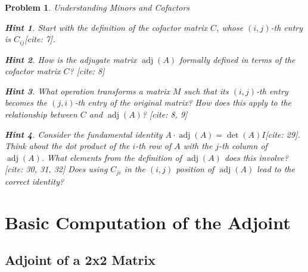 \documentclass[12pt]{article}
\newtheorem{problem}{Problem}[section]
\theoremstyle{definition}
\newtheorem{hint}{Hint}[question]
\newcommand{\adj}{\operatorname{adj}}
\newcommand{\detm}{\operatorname{det}}
\begin{document}
\begin{problem}{Understanding Minors and Cofactors}
        \begin{hint}
            Start with the definition of the cofactor matrix $C$, whose $(i, j)$-th entry is $C_{ij}$[cite: 7].
        \end{hint}
        \begin{hint}
            How is the adjugate matrix $\adj(A)$ formally defined in terms of the cofactor matrix $C$? [cite: 8]
        \end{hint}
        \begin{hint}
            What operation transforms a matrix $M$ such that its $(i, j)$-th entry becomes the $(j, i)$-th entry of the original matrix? How does this apply to the relationship between $C$ and $\adj(A)$? [cite: 8, 9]
        \end{hint}
        \begin{hint}
            Consider the fundamental identity $A \cdot \adj(A) = \detm(A) I$[cite: 29]. Think about the dot product of the $i$-th row of $A$ with the $j$-th column of $\adj(A)$. What elements from the definition of $\adj(A)$ does this involve? [cite: 30, 31, 32] Does using $C_{ji}$ in the $(i, j)$ position of $\adj(A)$ lead to the correct identity?
        \end{hint}
    
\end{problem}

\section{Basic Computation of the Adjoint}
\subsection{Adjoint of a 2x2 Matrix}
\end{document}
